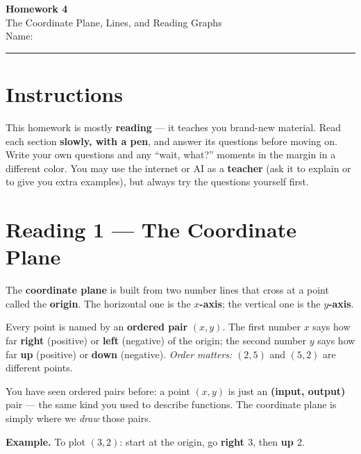 \documentclass[12pt]{article}
\newcommand{\gridaxes}[1]{%
  \draw[step=1,gray!25,very thin] (-#1,-#1) grid (#1,#1);%
  \draw[thick,->] (-#1-0.4,0)--(#1+0.4,0) node[right]{$x$};%
  \draw[thick,->] (0,-#1-0.4)--(0,#1+0.4) node[above]{$y$};%
  \foreach \n in {-#1,...,#1}{\ifnum\n=0\else
      \draw (\n,0.08)--(\n,-0.08) node[below]{\scriptsize$\n$};
      \draw (0.08,\n)--(-0.08,\n) node[left]{\scriptsize$\n$};\fi}%
}
\begin{document}
\pagestyle{fancy}
\begin{center}
  {\Large\bfseries Homework 4}\\[4pt]
  The Coordinate Plane, Lines, and Reading Graphs\\[6pt]
  Name:\;\underline{\hspace{6.5cm}}\quad
\end{center}
\hrule\bigskip

\section*{Instructions}
This homework is mostly \textbf{reading} --- it teaches you brand-new material. Read each section \textbf{slowly,
with a pen}, and answer its questions before moving on. Write your own questions and any ``wait, what?'' moments
in the margin in a different color. You may use the internet or AI as a \textbf{teacher} (ask it to
explain or to give you extra examples), but always try the questions yourself first.

\section*{Reading 1 --- The Coordinate Plane}
The \textbf{coordinate plane} is built from two number lines that cross at a point called the \textbf{origin}. The
horizontal one is the \textbf{$x$-axis}; the vertical one is the \textbf{$y$-axis}.

Every point is named by an \textbf{ordered pair} $(x,y)$. The first number $x$ says how far \textbf{right}
(positive) or \textbf{left} (negative) of the origin; the second number $y$ says how far \textbf{up} (positive) or
\textbf{down} (negative). \emph{Order matters:} $(2,5)$ and $(5,2)$ are different points.

You have seen ordered pairs before: a point $(x,y)$ is just an \textbf{(input, output)} pair --- the same kind you
used to describe functions. The coordinate plane is simply where we \emph{draw} those pairs.

\textbf{Example.} To plot $(3,2)$: start at the origin, go \textbf{right $3$}, then \textbf{up $2$}.

\begin{center}
\end{center}
\end{document}
